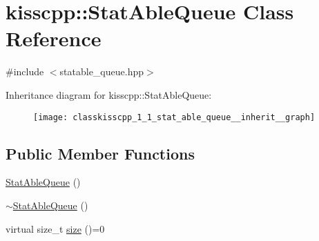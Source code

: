 \hypertarget{classkisscpp_1_1_stat_able_queue}{\section{kisscpp\-:\-:Stat\-Able\-Queue Class Reference}
\label{classkisscpp_1_1_stat_able_queue}
}


{\ttfamily \#include $<$statable\-\_\-queue.\-hpp$>$}



Inheritance diagram for kisscpp\-:\-:Stat\-Able\-Queue\-:
\nopagebreak
\begin{figure}[H]
\begin{center}
\leavevmode
\texttt{[image: classkisscpp\_1\_1\_stat\_able\_queue\_\_inherit\_\_graph]}
\end{center}
\end{figure}
\subsection*{Public Member Functions}
\begin{DoxyCompactItemize}
\item 
\hyperlink{classkisscpp_1_1_stat_able_queue_ac48bf84d284a91a49a3120c7d41f59ae}{Stat\-Able\-Queue} ()
\item 
\hyperlink{classkisscpp_1_1_stat_able_queue_ad4cad2fa806238b3f980bf94cbcbdac2}{$\sim$\-Stat\-Able\-Queue} ()
\item 
virtual size\-\_\-t \hyperlink{classkisscpp_1_1_stat_able_queue_a0d7e6287e783f80b9855bada5da98b80}{size} ()=0
\end{DoxyCompactItemize}


